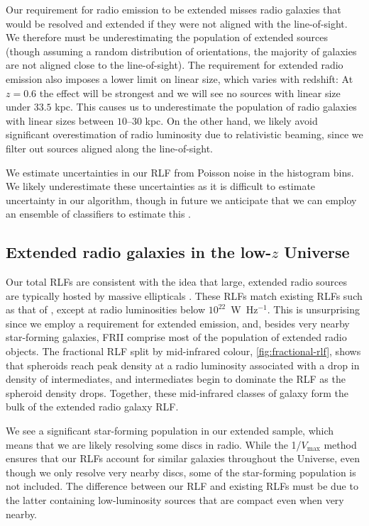     Our requirement for radio emission to be extended misses radio galaxies that would be resolved and extended if they were not aligned with the line-of-sight. We therefore must be underestimating the population of extended sources (though assuming a random distribution of orientations, the majority of galaxies are not aligned close to the line-of-sight). The requirement for extended radio emission also imposes a lower limit on linear size, which varies with redshift: At $z = 0.6$ the effect will be strongest and we will see no sources with linear size under $33.5$ kpc. This causes us to underestimate the population of radio galaxies with linear sizes between $10$--$30$ kpc. On the other hand, we likely avoid significant overestimation of radio luminosity due to relativistic beaming, since we filter out sources aligned along the line-of-sight.

    We estimate uncertainties in our RLF from Poisson noise in the histogram bins. We
    likely underestimate these uncertainties as it is difficult to
    estimate uncertainty in our algorithm, though in future we anticipate that we can
    employ an ensemble of classifiers to estimate this \citep[e.g.][]{lakshminarayanan17uncertainty}.

  \subsection{Extended radio galaxies in the low-$z$ Universe}

      Our total RLFs are consistent with the idea that large, extended radio sources are typically hosted by massive ellipticals \citep{best05agn}. These RLFs match existing RLFs such as that of \citet{mauch07rlf}, except at radio luminosities below $10^{22}$~W~Hz$^{-1}$. This is unsurprising since we employ a requirement for extended emission, and, besides very nearby star-forming galaxies, FRII comprise most of the population of extended radio objects. The fractional RLF split by mid-infrared colour, \autoref{fig:fractional-rlf}, shows that spheroids reach peak density at a radio luminosity associated with a drop in density of intermediates, and intermediates begin to dominate the RLF as the spheroid density drops. Together, these mid-infrared classes of galaxy form the bulk of the extended radio galaxy RLF.

      We see a significant star-forming population in our extended sample, which means that we are likely resolving some discs in radio. While the 1/$V_{\max}$ method ensures that our RLFs account for similar galaxies throughout the Universe, even though we only resolve very nearby discs, some of the star-forming population is not included. The difference between our RLF and existing RLFs must be due to the latter containing low-luminosity sources that are compact even when very nearby.

